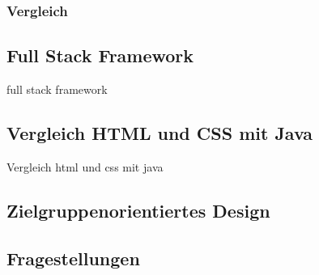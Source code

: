 		\subsubsection{Vergleich}
	\subsection{Full Stack Framework}
	\Gls{full stack framework}
	\subsection{Vergleich HTML und CSS mit Java}
	Vergleich \Gls{html} und \Gls{css} mit \Gls{java}
	\subsection{Zielgruppenorientiertes Design}
	\subsection{Fragestellungen}

